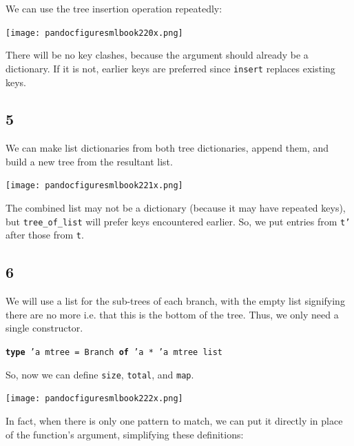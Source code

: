 \documentclass[]{book}
\newcommand{\smspace}{\vspace{4mm}}
\begin{document}
We can use the tree insertion operation repeatedly: 

\medskip
\begin{center}
\noindent\texttt{[image: pandocfiguresmlbook220x.png]}
\end{center}
\medskip

\noindent There will be no key clashes, because the argument should already be a dictionary. If it is not, earlier keys are preferred since \texttt{insert} replaces existing keys.

\subsection*{5}

We can make list dictionaries from both tree dictionaries, append them, and build a new tree from the resultant list.

\medskip
\begin{center}
\noindent\texttt{[image: pandocfiguresmlbook221x.png]}
\end{center}
\medskip

\noindent The combined list may not be a dictionary (because it may have repeated keys), but \texttt{tree\_of\_list} will prefer keys encountered earlier. So, we put entries from \texttt{t' } after those from \texttt{t}.

\subsection*{6}

We will use a list for the sub-trees of each branch, with the empty list signifying there are no more i.e. that this is the bottom of the tree. Thus, we only need a single constructor.

\smspace
\begin{center}
\begin{minipage}{0.8\textwidth}
  \textbf{\texttt{type}}\texttt{ 'a mtree = Branch }\textbf{\texttt{of}}\texttt{ 'a * 'a mtree list}
\end{minipage}
\end{center}
\smspace

\noindent So, now we can define \texttt{size}, \texttt{total}, and \texttt{map}.

\medskip
\begin{center}
\noindent\texttt{[image: pandocfiguresmlbook222x.png]}
\end{center}
\medskip

\noindent In fact, when there is only one pattern to match, we can put it directly in place of the function's argument, simplifying these definitions:
\end{document}
